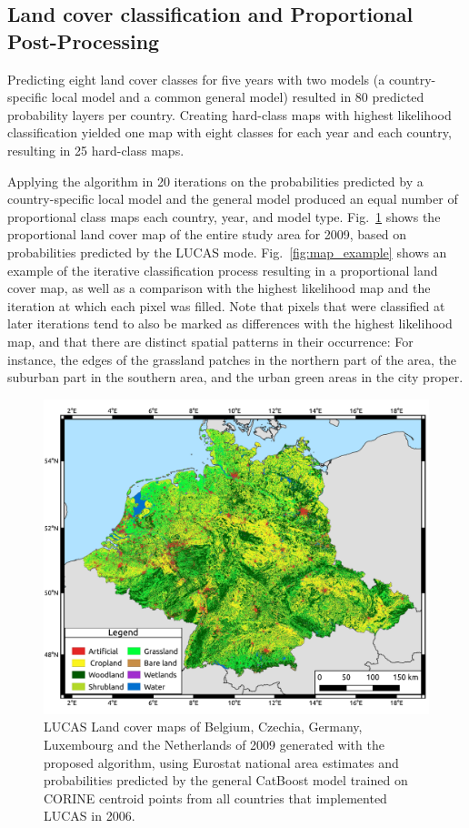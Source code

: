     \subsection{Land cover classification and Proportional Post-Processing}

    Predicting eight land cover classes for five years with two models (a country-specific local model and a common general model) resulted in 80 predicted probability layers per country. Creating hard-class maps with highest likelihood classification yielded one map with eight classes for each year and each country, resulting in 25 hard-class maps. 
    
    Applying the algorithm in 20 iterations on the probabilities predicted by a country-specific local model and the general model produced an equal number of proportional class maps each country, year, and model type. Fig.~\ref{fig:big_map_proportional} shows the proportional land cover map of the entire study area for 2009, based on probabilities predicted by the LUCAS mode. Fig.~\ref{fig:map_example} shows an example of the iterative classification process resulting in a proportional land cover map, as well as a comparison with the highest likelihood map and the iteration at which each pixel was filled. Note that pixels that were classified at later iterations tend to also be marked as differences with the highest likelihood map, and that there are distinct spatial patterns in their occurrence: For instance, the edges of the grassland patches in the northern part of the area, the suburban part in the southern area, and the urban green areas in the city proper.

    \begin{figure}[H]
        \centering
        \includegraphics[width=\linewidth]{figs_04/fig4_map.pdf}
        \caption{LUCAS Land cover maps of Belgium, Czechia, Germany, Luxembourg and the Netherlands of 2009 generated with the proposed algorithm, using Eurostat national area estimates and probabilities predicted by the general CatBoost model trained on CORINE centroid points from all countries that implemented LUCAS in 2006.}
        \label{fig:big_map_proportional}
    \end{figure}
    
